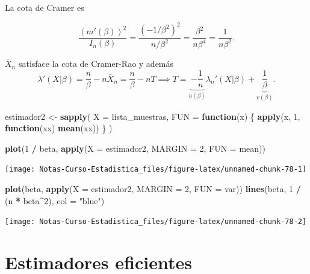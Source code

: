 \documentclass[
  12pt,
]{book}
\newenvironment{Shaded}{\begin{snugshade}}{\end{snugshade}}
\newcommand{\ControlFlowTok}[1]{\textcolor[rgb]{0.13,0.29,0.53}{\textbf{#1}}}
\newcommand{\DataTypeTok}[1]{\textcolor[rgb]{0.13,0.29,0.53}{#1}}
\newcommand{\DecValTok}[1]{\textcolor[rgb]{0.00,0.00,0.81}{#1}}
\newcommand{\KeywordTok}[1]{\textcolor[rgb]{0.13,0.29,0.53}{\textbf{#1}}}
\newcommand{\NormalTok}[1]{#1}
\newcommand{\OperatorTok}[1]{\textcolor[rgb]{0.81,0.36,0.00}{\textbf{#1}}}
\newcommand{\StringTok}[1]{\textcolor[rgb]{0.31,0.60,0.02}{#1}}
\begin{document}
La cota de Cramer es

\[\dfrac{(m'(\beta))^2}{I_n(\beta)} = \dfrac{(-1/\beta^2)^2}{n/\beta^2} = \dfrac{\beta^2}{n\beta^4} = \dfrac{1}{n\beta^2}.\]

\(\bar X_n\) satisface la cota de Cramer-Rao y además
\[\lambda'(X|\beta) = \dfrac n\beta - n\bar X_n =\dfrac n\beta - nT \implies T = \underbrace{-\dfrac 1n}_{u(\beta)}\lambda_n'(X|\beta)+ \underbrace{\dfrac 1\beta}_{v(\beta)}. \]

\begin{Shaded}
\begin{Highlighting}[]
\NormalTok{estimador2 \textless{}{-}}\StringTok{ }\KeywordTok{sapply}\NormalTok{(}
  \DataTypeTok{X =}\NormalTok{ lista\_muestras,}
  \DataTypeTok{FUN =} \ControlFlowTok{function}\NormalTok{(x) \{}
    \KeywordTok{apply}\NormalTok{(x, }\DecValTok{1}\NormalTok{, }\ControlFlowTok{function}\NormalTok{(xx) }\KeywordTok{mean}\NormalTok{(xx))}
\NormalTok{  \}}
\NormalTok{)}

\KeywordTok{plot}\NormalTok{(}\DecValTok{1} \OperatorTok{/}\StringTok{ }\NormalTok{beta, }\KeywordTok{apply}\NormalTok{(}\DataTypeTok{X =}\NormalTok{ estimador2, }\DataTypeTok{MARGIN =} \DecValTok{2}\NormalTok{, }\DataTypeTok{FUN =}\NormalTok{ mean))}
\end{Highlighting}
\end{Shaded}

\begin{center}\texttt{[image: Notas-Curso-Estadistica\_files/figure-latex/unnamed-chunk-78-1]} \end{center}

\begin{Shaded}
\begin{Highlighting}[]
\KeywordTok{plot}\NormalTok{(beta, }\KeywordTok{apply}\NormalTok{(}\DataTypeTok{X =}\NormalTok{ estimador2, }\DataTypeTok{MARGIN =} \DecValTok{2}\NormalTok{, }\DataTypeTok{FUN =}\NormalTok{ var))}
\KeywordTok{lines}\NormalTok{(beta, }\DecValTok{1} \OperatorTok{/}\StringTok{ }\NormalTok{(n }\OperatorTok{*}\StringTok{ }\NormalTok{beta}\OperatorTok{\^{}}\DecValTok{2}\NormalTok{), }\DataTypeTok{col =} \StringTok{"blue"}\NormalTok{)}
\end{Highlighting}
\end{Shaded}

\begin{center}\texttt{[image: Notas-Curso-Estadistica\_files/figure-latex/unnamed-chunk-78-2]} \end{center}

\hypertarget{estimadores-eficientes}{%
\section{Estimadores eficientes}\label{estimadores-eficientes}}
\end{document}
